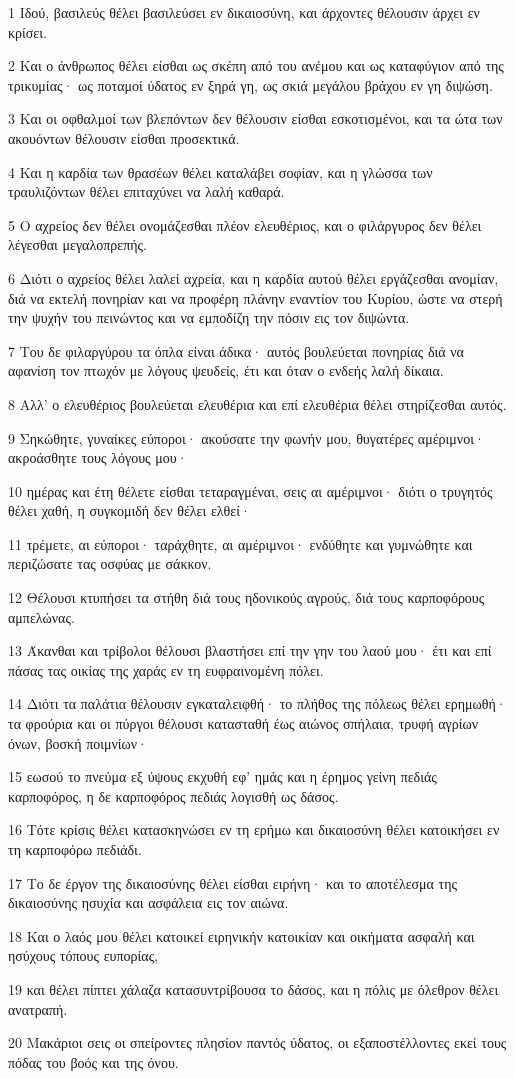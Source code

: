 \par 1 Ιδού, βασιλεύς θέλει βασιλεύσει εν δικαιοσύνη, και άρχοντες θέλουσιν άρχει εν κρίσει.
\par 2 Και ο άνθρωπος θέλει είσθαι ως σκέπη από του ανέμου και ως καταφύγιον από της τρικυμίας· ως ποταμοί ύδατος εν ξηρά γη, ως σκιά μεγάλου βράχου εν γη διψώση.
\par 3 Και οι οφθαλμοί των βλεπόντων δεν θέλουσιν είσθαι εσκοτισμένοι, και τα ώτα των ακουόντων θέλουσιν είσθαι προσεκτικά.
\par 4 Και η καρδία των θρασέων θέλει καταλάβει σοφίαν, και η γλώσσα των τραυλιζόντων θέλει επιταχύνει να λαλή καθαρά.
\par 5 Ο αχρείος δεν θέλει ονομάζεσθαι πλέον ελευθέριος, και ο φιλάργυρος δεν θέλει λέγεσθαι μεγαλοπρεπής.
\par 6 Διότι ο αχρείος θέλει λαλεί αχρεία, και η καρδία αυτού θέλει εργάζεσθαι ανομίαν, διά να εκτελή πονηρίαν και να προφέρη πλάνην εναντίον του Κυρίου, ώστε να στερή την ψυχήν του πεινώντος και να εμποδίζη την πόσιν εις τον διψώντα.
\par 7 Του δε φιλαργύρου τα όπλα είναι άδικα· αυτός βουλεύεται πονηρίας διά να αφανίση τον πτωχόν με λόγους ψευδείς, έτι και όταν ο ενδεής λαλή δίκαια.
\par 8 Αλλ' ο ελευθέριος βουλεύεται ελευθέρια και επί ελευθέρια θέλει στηρίζεσθαι αυτός.
\par 9 Σηκώθητε, γυναίκες εύποροι· ακούσατε την φωνήν μου, θυγατέρες αμέριμνοι· ακροάσθητε τους λόγους μου·
\par 10 ημέρας και έτη θέλετε είσθαι τεταραγμέναι, σεις αι αμέριμνοι· διότι ο τρυγητός θέλει χαθή, η συγκομιδή δεν θέλει ελθεί·
\par 11 τρέμετε, αι εύποροι· ταράχθητε, αι αμέριμνοι· ενδύθητε και γυμνώθητε και περιζώσατε τας οσφύας με σάκκον.
\par 12 Θέλουσι κτυπήσει τα στήθη διά τους ηδονικούς αγρούς, διά τους καρποφόρους αμπελώνας.
\par 13 Άκανθαι και τρίβολοι θέλουσι βλαστήσει επί την γην του λαού μου· έτι και επί πάσας τας οικίας της χαράς εν τη ευφραινομένη πόλει.
\par 14 Διότι τα παλάτια θέλουσιν εγκαταλειφθή· το πλήθος της πόλεως θέλει ερημωθή· τα φρούρια και οι πύργοι θέλουσι κατασταθή έως αιώνος σπήλαια, τρυφή αγρίων όνων, βοσκή ποιμνίων·
\par 15 εωσού το πνεύμα εξ ύψους εκχυθή εφ' ημάς και η έρημος γείνη πεδιάς καρποφόρος, η δε καρποφόρος πεδιάς λογισθή ως δάσος.
\par 16 Τότε κρίσις θέλει κατασκηνώσει εν τη ερήμω και δικαιοσύνη θέλει κατοικήσει εν τη καρποφόρω πεδιάδι.
\par 17 Το δε έργον της δικαιοσύνης θέλει είσθαι ειρήνη· και το αποτέλεσμα της δικαιοσύνης ησυχία και ασφάλεια εις τον αιώνα.
\par 18 Και ο λαός μου θέλει κατοικεί ειρηνικήν κατοικίαν και οικήματα ασφαλή και ησύχους τόπους ευπορίας,
\par 19 και θέλει πίπτει χάλαζα κατασυντρίβουσα το δάσος, και η πόλις με όλεθρον θέλει ανατραπή.
\par 20 Μακάριοι σεις οι σπείροντες πλησίον παντός ύδατος, οι εξαποστέλλοντες εκεί τους πόδας του βοός και της όνου.


